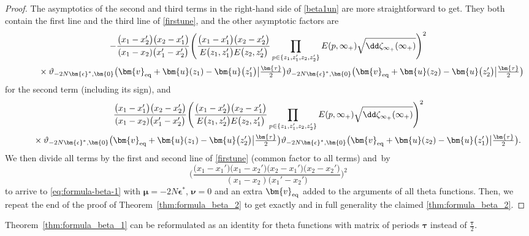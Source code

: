 \documentclass[pdftex]{sigma}
\numberwithin{equation}{section}
\begin{document}
\begin{proof}
The asymptotics of the second and third terms in the right-hand side of \eqref{beta1un} are more straightforward to get. They both contain the first line and the third line of \eqref{firstune}, and the other asymptotic factors are
\begin{gather*}
 - \frac{\bigl(x_1 - x_2'\bigr)\bigl(x_2 - x_1'\bigr)}{(x_1 - x_2)\bigl(x_1' - x_2'\bigr)}\Biggl(\frac{\bigl(x_1 - x_1'\bigr)\bigl(x_2 - x_2'\bigr)}{E\bigl(z_1,z_1'\bigr)E\bigl(z_2,z_2'\bigr)} \prod_{p \in \{z_1,z_1',z_2,z_2'\}} E(p,\infty_+)\sqrt{\dd \zeta_{\infty_+}(\infty_+)}\Biggr)^2 \\
 \qquad\quad{}\times \vartheta_{-2N\bm{\epsilon}^*,\bm{0}}\bigl(\bm{v}_{{\rm eq}} + \bm{u}(z_1) - \bm{u}\bigl(z_1'\bigr)\big|\tfrac{\bm{\tau}}{2}\bigr) \vartheta_{-2N\bm{\epsilon}^*,\bm{0}}\bigl(\bm{v}_{{\rm eq}} + \bm{u}(z_2) - \bm{u}\bigl(z_2'\bigr)\big|\tfrac{\bm{\tau}}{2}\bigr)
\end{gather*}
for the second term (including its sign), and
\begin{gather*}
 \frac{\bigl(x_1 - x_1'\bigr)\bigl(x_2 - x_2'\bigr)}{(x_1 - x_2)\bigl(x_1' - x_2'\bigr)} \Biggl(\frac{\bigl(x_1 - x_2'\bigr)\bigl(x_2 - x_1'\bigr)}{E\bigl(z_1,z_2'\bigr)E\bigl(z_2,z_1'\bigr)} \prod_{p \in \{z_1,z_1',z_2,z_2'\}} E(p,\infty_+) \sqrt{\dd\zeta_{\infty_+}(\infty_+)} \Biggr)^2 \\
 \qquad{}\times \vartheta_{-2N\bm{\epsilon}^*,\bm{0}}\bigl(\bm{v}_{{\rm eq}} + \bm{u}(z_1) - \bm{u}\bigl(z_2'\bigr)\big|\tfrac{\bm{\tau}}{2}\bigr) \vartheta_{-2N\bm{\epsilon}^*,\bm{0}}\bigl(\bm{v}_{{\rm eq}} + \bm{u}(z_2) - \bm{u}\bigl(z_1'\bigr)\big|\tfrac{\bm{\tau}}{2}\bigr).
\end{gather*}
We then divide all terms by the first and second line of \eqref{firstune} (common
factor to all terms) and~by
\[
\Biggl(\frac{\bigl(x_1 - x_1'\bigr)\bigl(x_1 - x_2'\bigr)\bigl(x_2 - x_1'\bigr)\bigl(x_2 - x_2'\bigr)}{(x_1 - x_2)\bigl(x_1' - x_2'\bigr)}\Biggr)^2
\]
to arrive to \eqref{eq:formula-beta-1} with $\bm{\mu} = -2N \bm{\epsilon}^*$, $\bm{\nu} = 0$ and an extra $\bm{v}_{{\rm eq}}$ added to the arguments of all theta functions. Then, we repeat the end of the proof of Theorem~\ref{thm:formula_beta_2} to get exactly and in full generality the claimed \eqref{thm:formula_beta_2}.
\end{proof}

Theorem~\ref{thm:formula_beta_1} can be reformulated as an identity for theta functions with matrix of periods $\bm{\tau}$ instead of $\frac{\bm{\tau}}{2}$.
\end{document}
